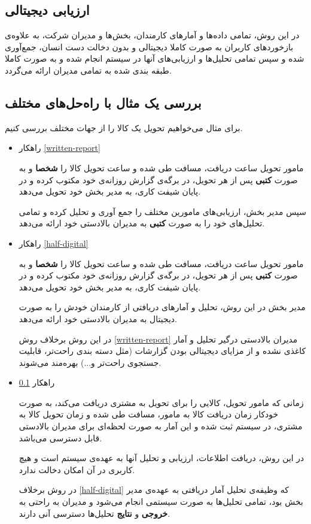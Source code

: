 \documentclass[12pt]{article}
\begin{document}
\subsection{ارزیابی دیجیتالی}\label{full-digital}
در این روش، تمامی داده‌ها و آمار‌های کارمندان، بخش‌ها و مدیران شرکت، به علاوه‌ی بازخورد‌های کاربران به صورت کاملا دیجیتالی و بدون دخالت دست انسان، جمع‌آوری شده و سپس تمامی تحلیل‌ها و ارزیابی‌های آنها در سیستم  انجام شده و به صورت کاملا طبقه بندی شده به تمامی مدیران ارائه می‌گردد.

\subsection{بررسی یک مثال با راه‌حل‌های مختلف}
برای مثال می‌خواهیم تحویل یک کالا را از جهات مختلف بررسی کنیم.
\begin{itemize}
    \item راهکار \ref{written-report}
    
    مامور تحویل ساعت دریافت، مسافت طی شده و ساعت تحویل کالا را \textbf{شخصا} و به صورت \textbf{کتبی} پس از هر تحویل، در برگه‌ی گزارش روزانه‌ی خود مکتوب کرده و در پایان شیفت کاری، به مدیر بخش خود تحویل می‌دهد.
    
    سپس مدیر بخش، ارزیابی‌های مامورین مختلف را جمع آوری و تحلیل کرده و تمامی تحلیل‌های خود را به صورت \textbf{کتبی} به مدیران بالادستی خود ارائه می‌دهد.
    
    \item راهکار \ref{half-digital}
    
        مامور تحویل ساعت دریافت، مسافت طی شده و ساعت تحویل کالا را \textbf{شخصا} و به صورت \textbf{کتبی} پس از هر تحویل، در برگه‌ی گزارش روزانه‌ی خود مکتوب کرده و در پایان شیفت کاری، به مدیر بخش خود تحویل می‌دهد.
    
    مدیر بخش در این روش، تحلیل‌ و آمار‌های دریافتی از کارمندان خودش را به صورت دیجیتال به مدیران بالادستی خود ارائه می‌دهد.
    
    در این روش برخلاف روش \ref{written-report} مدیران بالادستی درگیر تحلیل و آمار کاغذی نشده و از مزایای دیجیتالی بودن گزارشات (مثل دسته بندی راحت‌تر، قابلیت جستجو‌ی راحت‌تر و...) بهره‌مند می‌شوند.
    \item راهکار \ref{full-digital}
    
    زمانی که مامور تحویل، کالایی را برای تحویل به مشتری دریافت می‌کند، به صورت خودکار زمان دریافت کالا به مامور، مسافت طی شده و زمان تحویل کالا به مشتری، در سیستم ثبت شده و این آمار به صورت لحظه‌‌ای برای مدیران بالادستی قابل دسترسی می‌باشد.
    
    در این روش، دریافت اطلاعات، ارزیابی و تحلیل آنها به عهده‌ی سیستم است و هیچ کاربری در آن امکان دخالت ندارد. 
    
    در روش برخلاف \ref{half-digital} که وظیفه‌ی تحلیل آمار دریافتی به عهده‌ی مدیر بخش بود، تمامی تحلیل‌ها به صورت سیستمی انجام می‌شود و مدیران به راحتی به \textbf{خروجی} و \textbf{نتایج} تحلیل‌ها دسترسی آنی دارند.
    
\end{itemize}
\end{document}
